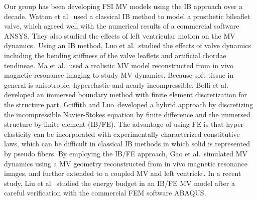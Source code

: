 \documentclass[fleqn,10pt]{wlscirep}
\begin{document}
Our group has been developing FSI MV models using the IB approach over a decade. Watton et al.\,\cite{Watton2007Dynamic} used a classical IB method to model a prosthetic bileaflet valve, which agreed well with the numerical results of a commercial software ANSYS.  They also studied the effects of left ventricular motion on the MV dynamics\,\cite{Watton2008Effect}. Using an IB method, Luo et al.\,\cite{LuoGriffith-2012} studied the effects of valve dynamics including the bending stiffness of the valve leaflets and artificial chordae tendineae. Ma et al.\,\cite{Ma:2013fr} used a realistic MV model reconstructed from in vivo magnetic resonance imaging to study MV dynamics.  Because soft tissue in general is anisotropic, hyperelastic and nearly incompressible, Boffi et al.\,\cite{boffi2008hyper} developed an immersed boundary method with finite element discretization for the structure part.  Griffith and Luo\,\cite{Boyce2017Hybrid}  developed a hybrid approach by discretizing the incompressible Navier-Stokes equation by  finite difference and the immersed structure by finite element (IB/FE). The advantage of using FE is that hyper-elasticity can be incorporated with experimentally characterized constitutive laws, which can be difficult in classical IB methods in which solid is represented by pseudo fibers\cite{peskin_2002,LuoGriffith-2012}. By employing the IB/FE approach, Gao et al.\,\cite{Hao2014A} simulated MV dynamics using a MV geometry reconstructed from in vivo magnetic resonance images, and further extended to a coupled MV and left ventricle\,\cite{Gao2017A}.  In a recent study, Liu et al.\,\cite{feng2018chordae} studied the energy budget in an IB/FE MV model after a careful verification with the commercial FEM software ABAQUS. 

\end{document}
